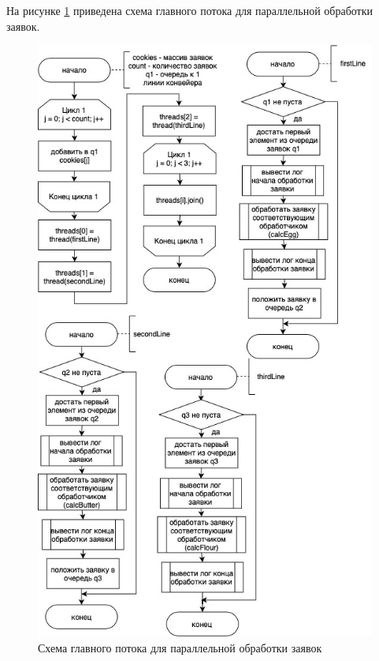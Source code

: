 \documentclass[12pt]{report}
\begin{document}
На рисунке \ref{mainThread} приведена схема главного потока для параллельной обработки заявок.

\begin{figure}[h]
	\centering
	\includegraphics[scale = 0.51]{mainThread.jpg}
	\caption{Схема главного потока для параллельной обработки заявок}
	\label{mainThread}
\end{figure}

\newpage
\end{document}
